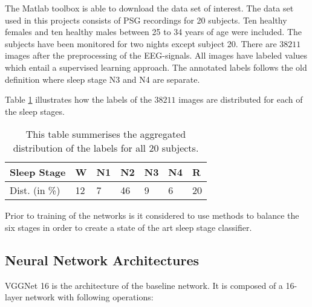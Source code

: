 The Matlab toolbox is able to download the data set of interest. The data set used in this projects consists of PSG recordings for 20 subjects. Ten healthy females and ten healthy males between 25 to 34 years of age were included. The subjects have been monitored for two nights except subject 20. There are $38211$ images after the preprocessing of the EEG-signals. All images have labeled values which entail a supervised learning approach. The annotated labels follows the old definition where sleep stage N3 and N4 are separate. 

Table \ref{tab_class_balance} illustrates how the labels of the $38211$ images are distributed for each of the sleep stages.
\begin{table}[th!]
\begin{tabular}{l|llllll}
Sleep Stage & W & N1 &  N2& N3 & N4 & R \\\hline
Dist. (in \%) &12 &7&46&9&6&20
\end{tabular}
\caption{This table summerises the aggregated distribution of the labels for all 20 subjects. }
\label{tab_class_balance}
\end{table}
Prior to training of the networks is it considered to use methods to balance the six stages in order to create a state of the art sleep stage classifier.

\subsection{Neural Network Architectures}
VGGNet 16 \cite{main_ar, VGGnet16} is the architecture of the baseline network. It is composed of a 16-layer network with following operations:

